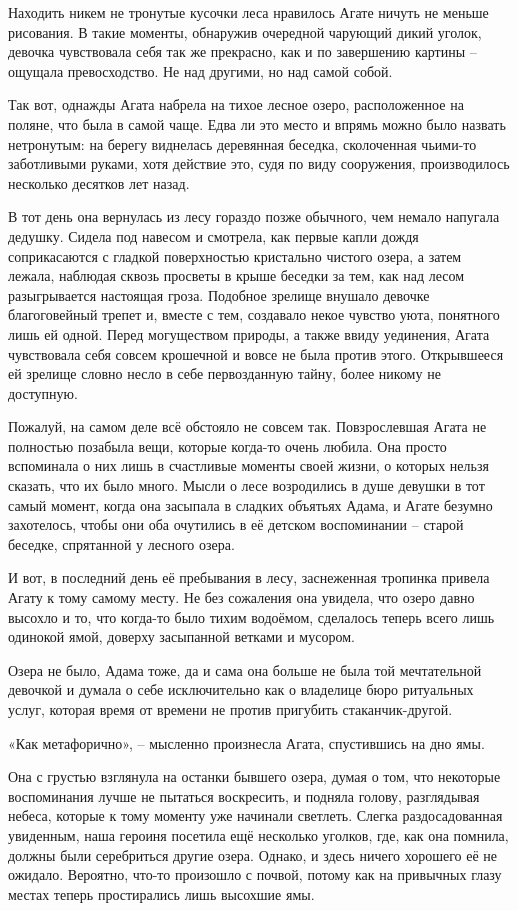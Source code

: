 \documentclass[
  a5paperpaper,
  DIV=11,
  numbers=noendperiod]{scrreprt}
\begin{document}
Находить никем не тронутые кусочки леса нравилось Агате ничуть не меньше
рисования. В такие моменты, обнаружив очередной чарующий дикий уголок,
девочка чувствовала себя так же прекрасно, как и по завершению картины
-- ощущала превосходство. Не над другими, но над самой собой.

Так вот, однажды Агата набрела на тихое лесное озеро, расположенное на
поляне, что была в самой чаще. Едва ли это место и впрямь можно было
назвать нетронутым: на берегу виднелась деревянная беседка, сколоченная
чьими-то заботливыми руками, хотя действие это, судя по виду сооружения,
производилось несколько десятков лет назад.

В тот день она вернулась из лесу гораздо позже обычного, чем немало
напугала дедушку. Сидела под навесом и смотрела, как первые капли дождя
соприкасаются с гладкой поверхностью кристально чистого озера, а затем
лежала, наблюдая сквозь просветы в крыше беседки за тем, как над лесом
разыгрывается настоящая гроза. Подобное зрелище внушало девочке
благоговейный трепет и, вместе с тем, создавало некое чувство уюта,
понятного лишь ей одной. Перед могуществом природы, а также ввиду
уединения, Агата чувствовала себя совсем крошечной и вовсе не была
против этого. Открывшееся ей зрелище словно несло в себе первозданную
тайну, более никому не доступную.

Пожалуй, на самом деле всё обстояло не совсем так. Повзрослевшая Агата
не полностью позабыла вещи, которые когда-то очень любила. Она просто
вспоминала о них лишь в счастливые моменты своей жизни, о которых нельзя
сказать, что их было много. Мысли о лесе возродились в душе девушки в
тот самый момент, когда она засыпала в сладких объятьях Адама, и Агате
безумно захотелось, чтобы они оба очутились в её детском воспоминании --
старой беседке, спрятанной у лесного озера.

И вот, в последний день её пребывания в лесу, заснеженная тропинка
привела Агату к тому самому месту. Не без сожаления она увидела, что
озеро давно высохло и то, что когда-то было тихим водоёмом, сделалось
теперь всего лишь одинокой ямой, доверху засыпанной ветками и мусором.

Озера не было, Адама тоже, да и сама она больше не была той мечтательной
девочкой и думала о себе исключительно как о владелице бюро ритуальных
услуг, которая время от времени не против пригубить стаканчик-другой.

«Как метафорично», -- мысленно произнесла Агата, спустившись на дно ямы.

Она с грустью взглянула на останки бывшего озера, думая о том, что
некоторые воспоминания лучше не пытаться воскресить, и подняла голову,
разглядывая небеса, которые к тому моменту уже начинали светлеть. Слегка
раздосадованная увиденным, наша героиня посетила ещё несколько уголков,
где, как она помнила, должны были серебриться другие озера. Однако, и
здесь ничего хорошего её не ожидало. Вероятно, что-то произошло с
почвой, потому как на привычных глазу местах теперь простирались лишь
высохшие ямы.
\end{document}
